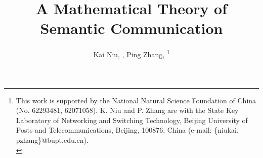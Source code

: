 \documentclass[12pt, draftclsnofoot,onecolumn]{IEEEtran}
\begin{document}
%
\title{A Mathematical Theory of Semantic Communication}

\author{Kai Niu, , Ping Zhang,  
\thanks
{
This work is supported by the National Natural Science Foundation of China (No. 62293481, 62071058).
\indent K. Niu and P. Zhang are with the State Key Laboratory of Networking and Switching Technology, Beijing University of Posts and Telecommunications,  Beijing, 100876, China (e-mail: \{niukai, pzhang\}@bupt.edu.cn). \protect\\
}}


\maketitle
\end{document}
